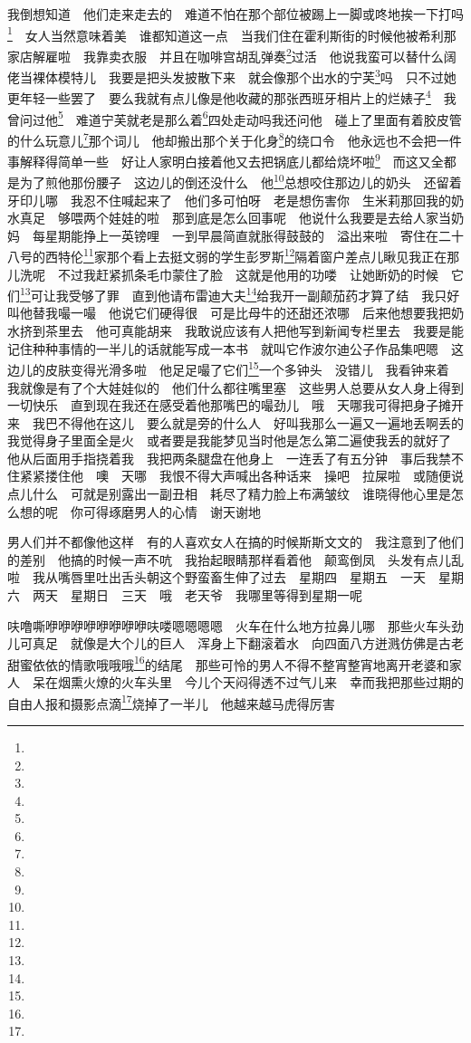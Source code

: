 \par 我倒想知道　他们走来走去的　难道不怕在那个部位被踢上一脚或咚地挨一下打吗\footnote{}　女人当然意味着美　谁都知道这一点　当我们住在霍利斯街的时候他被希利那家店解雇啦　我靠卖衣服　并且在咖啡宫胡乱弹奏\footnote{}过活　他说我蛮可以替什么阔佬当裸体模特儿　我要是把头发披散下来　就会像那个出水的宁芙\footnote{}吗　只不过她更年轻一些罢了　要么我就有点儿像是他收藏的那张西班牙相片上的烂婊子\footnote{}　我曾问过他\footnote{}　难道宁芙就老是那么着\footnote{}四处走动吗我还问他　碰上了里面有着胶皮管的什么玩意儿\footnote{}那个词儿　他却搬出那个关于化身\footnote{}的绕口令　他永远也不会把一件事解释得简单一些　好让人家明白接着他又去把锅底儿都给烧坏啦\footnote{}　而这又全都是为了煎他那份腰子　这边儿的倒还没什么　他\footnote{}总想咬住那边儿的奶头　还留着牙印儿哪　我忍不住喊起来了　他们多可怕呀　老是想伤害你　生米莉那回我的奶水真足　够喂两个娃娃的啦　那到底是怎么回事呢　他说什么我要是去给人家当奶妈　每星期能挣上一英镑哩　一到早晨简直就胀得鼓鼓的　溢出来啦　寄住在二十八号的西特伦\footnote{}家那个看上去挺文弱的学生彭罗斯\footnote{}隔着窗户差点儿瞅见我正在那儿洗呢　不过我赶紧抓条毛巾蒙住了脸　这就是他用的功喽　让她断奶的时候　它们\footnote{}可让我受够了罪　直到他请布雷迪大夫\footnote{}给我开一副颠茄药才算了结　我只好叫他替我嘬一嘬　他说它们硬得很　可是比母牛的还甜还浓哪　后来他想要我把奶水挤到茶里去　他可真能胡来　我敢说应该有人把他写到新闻专栏里去　我要是能记住种种事情的一半儿的话就能写成一本书　就叫它作波尔迪公子作品集吧嗯　这边儿的皮肤变得光滑多啦　他足足嘬了它们\footnote{}一个多钟头　没错儿　我看钟来着　我就像是有了个大娃娃似的　他们什么都往嘴里塞　这些男人总要从女人身上得到一切快乐　直到现在我还在感受着他那嘴巴的嘬劲儿　哦　天哪我可得把身子摊开来　我巴不得他在这儿　要么就是旁的什么人　好叫我那么一遍又一遍地丢啊丢的　我觉得身子里面全是火　或者要是我能梦见当时他是怎么第二遍使我丢的就好了　他从后面用手指挠着我　我把两条腿盘在他身上　一连丢了有五分钟　事后我禁不住紧紧搂住他　噢　天哪　我恨不得大声喊出各种话来　操吧　拉屎啦　或随便说点儿什么　可就是别露出一副丑相　耗尽了精力脸上布满皱纹　谁晓得他心里是怎么想的呢　你可得琢磨男人的心情　谢天谢地　
\par 男人们并不都像他这样　有的人喜欢女人在搞的时候斯斯文文的　我注意到了他们的差别　他搞的时候一声不吭　我抬起眼睛那样看着他　颠鸾倒凤　头发有点儿乱啦　我从嘴唇里吐出舌头朝这个野蛮畜生伸了过去　星期四　星期五　一天　星期六　两天　星期日　三天　哦　老天爷　我哪里等得到星期一呢　
\par 呋噜嘶咿咿咿咿咿咿咿咿呋喽嗯嗯嗯嗯　火车在什么地方拉鼻儿哪　那些火车头劲儿可真足　就像是大个儿的巨人　浑身上下翻滚着水　向四面八方迸溅仿佛是古老甜蜜依依的情歌哦哦哦\footnote{}的结尾　那些可怜的男人不得不整宵整宵地离开老婆和家人　呆在烟熏火燎的火车头里　今儿个天闷得透不过气儿来　幸而我把那些过期的自由人报和摄影点滴\footnote{}烧掉了一半儿　他越来越马虎得厉害　
